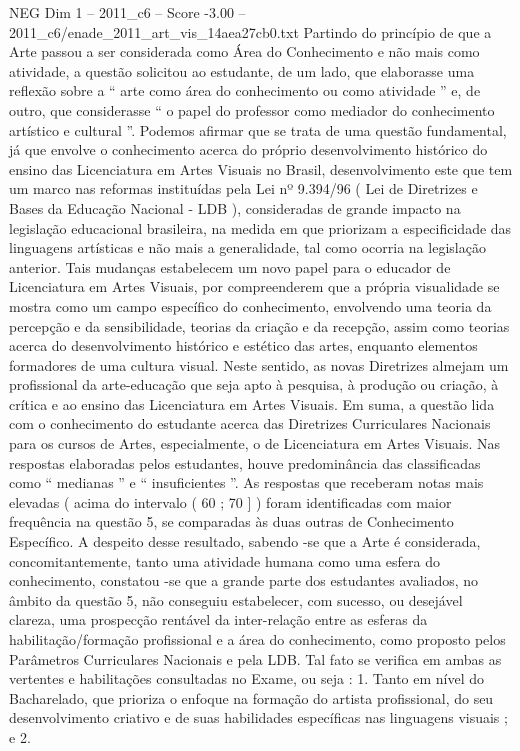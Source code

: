 \begin{textsample}{NEG Dim 1 – 2011\_c6 – Score -3.00 – 2011\_c6/enade\_2011\_art\_vis\_14aea27cb0.txt}
Partindo do princípio de que a Arte passou a ser considerada como Área do Conhecimento e não mais como atividade, a questão solicitou ao estudante, de um lado, que elaborasse uma reflexão sobre a “ arte como área do conhecimento ou como atividade ” e, de outro, que considerasse “ o papel do professor como mediador do conhecimento artístico e cultural ”.
Podemos afirmar que se trata de uma questão fundamental, já que envolve o conhecimento acerca do próprio desenvolvimento histórico do ensino das Licenciatura em Artes Visuais no Brasil, desenvolvimento este que tem um marco nas reformas instituídas pela Lei nº 9.394/96 ( Lei de Diretrizes e Bases da Educação Nacional - LDB ), consideradas de grande impacto na legislação educacional brasileira, na medida em que priorizam a especificidade das linguagens artísticas e não mais a generalidade, tal como ocorria na legislação anterior.
Tais mudanças estabelecem um novo papel para o educador de Licenciatura em Artes Visuais, por compreenderem que a própria visualidade se mostra como um campo específico do conhecimento, envolvendo uma teoria da percepção e da sensibilidade, teorias da criação e da recepção, assim como teorias acerca do desenvolvimento histórico e estético das artes, enquanto elementos formadores de uma cultura visual.
Neste sentido, as novas Diretrizes almejam um profissional da arte-educação que seja apto à pesquisa, à produção ou criação, à crítica e ao ensino das Licenciatura em Artes Visuais.
Em suma, a questão lida com o conhecimento do estudante acerca das Diretrizes Curriculares Nacionais para os cursos de Artes, especialmente, o de Licenciatura em Artes Visuais.
Nas respostas elaboradas pelos estudantes, houve predominância das classificadas como “ medianas ” e “ insuficientes ”.
As respostas que receberam notas mais elevadas ( acima do intervalo ( 60 ; 70 ] ) foram identificadas com maior frequência na questão 5, se comparadas às duas outras de Conhecimento Específico.
A despeito desse resultado, sabendo -se que a Arte é considerada, concomitantemente, tanto uma atividade humana como uma esfera do conhecimento, constatou -se que a grande parte dos estudantes avaliados, no âmbito da questão 5, não conseguiu estabelecer, com sucesso, ou desejável clareza, uma prospecção rentável da inter-relação entre as esferas da habilitação/formação profissional e a área do conhecimento, como proposto pelos Parâmetros Curriculares Nacionais e pela LDB.
Tal fato se verifica em ambas as vertentes e habilitações consultadas no Exame, ou seja : 1.
Tanto em nível do Bacharelado, que prioriza o enfoque na formação do artista profissional, do seu desenvolvimento criativo e de suas habilidades específicas nas linguagens visuais ; e 2.

\end{textsample}
